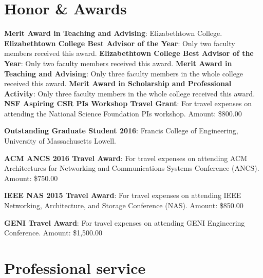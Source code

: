 \documentclass[11pt]{moderncv}
\begin{document}
\section{Honor \& Awards}
%
{\textbf{Merit Award in Teaching and Advising}: Elizabethtown College. \newline
}
%
{\textbf{Elizabethtown College Best Advisor of the Year}: Only two faculty members received this award. \newline
}
%
{\textbf{Elizabethtown College Best Advisor of the Year}: Only two faculty members received this award. \newline
}
%
{\textbf{Merit Award in Teaching and Advising}: Only three faculty members in the whole college received this award. \newline
}
%
{\textbf{Merit Award in Scholarship and Professional Activity}: Only three faculty members in the whole college received this award. \newline
}
%
{\textbf{NSF Aspiring CSR PIs Workshop Travel Grant}: For travel expenses on attending the National Science Foundation PIs workshop. \newline
Amount: \$800.00
}

%
{\textbf{Outstanding Graduate Student 2016}: Francis College of Engineering, University of Massachusetts Lowell.
}

%
{\textbf{ACM ANCS 2016 Travel Award}: For travel expenses on attending ACM Architectures for Networking and Communications Systems Conference (ANCS). \newline
Amount: \$750.00
}

%
{\textbf{IEEE NAS 2015 Travel Award}: For travel expenses on attending IEEE Networking, Architecture, and Storage Conference (NAS). \newline
Amount: \$850.00
}

%
{\textbf{GENI Travel Award}: For travel expenses on attending GENI Engineering Conference. \newline
Amount: \$1,500.00
}

\section{Professional service}
%
\end{document}
